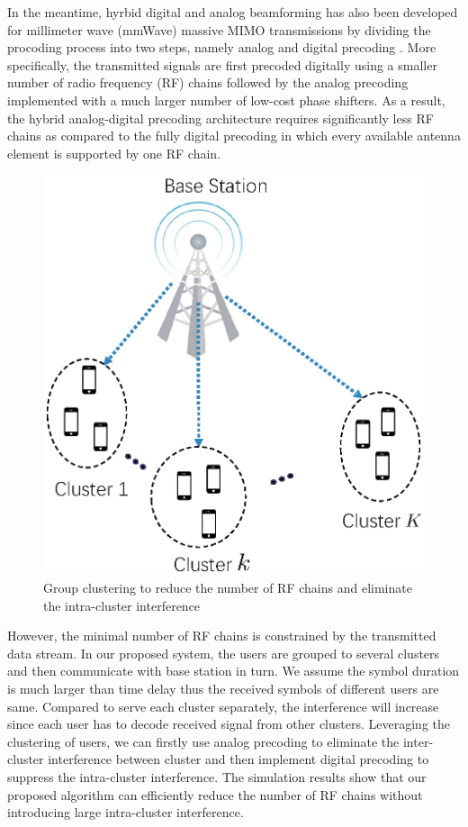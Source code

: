 \documentclass[conference]{IEEEtran}
\begin{document}
In the meantime, hyrbid digital and analog beamforming has also been developed for millimeter wave (mmWave) massive MIMO transmissions by dividing the procoding process into two steps, namely analog and digital precoding \cite{han2015large, el2014spatially}. More specifically, the transmitted signals are first precoded digitally using a smaller number of radio frequency (RF) chains followed by the analog precoding implemented with a much larger number of low-cost phase shifters. As a result, the hybrid analog-digital precoding architecture requires significantly less RF chains as compared to the fully digital precoding in which every available antenna element is supported by one RF chain. 

\begin{figure}[h]
	\begin{center}
		\includegraphics[scale=0.55]{PPTFigure/groupcluster.eps}
		\caption{Group clustering to reduce the number of RF chains and eliminate the intra-cluster interference}\label{fig:BDMA}
	\end{center}
\end{figure}

{\color{red}However, the minimal number of RF chains is constrained by the transmitted data stream. In our proposed system, the users are grouped to several clusters and then communicate with base station in turn. We assume the symbol duration is much larger than time delay thus the received symbols of different users are same. Compared to serve each cluster separately, the interference will increase since each user has to decode received signal from other clusters. Leveraging the clustering
 of users, we can firstly use analog precoding to eliminate the inter-cluster interference between cluster and then implement digital precoding to suppress the intra-cluster interference. The simulation results show that our proposed algorithm can efficiently reduce the number of RF chains without introducing large intra-cluster interference.} 
\end{document}
